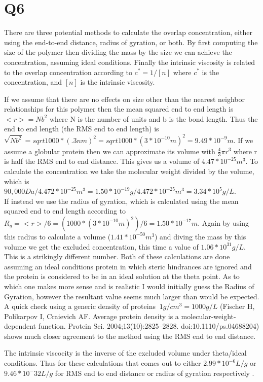 \documentclass[12pt]{article}
\begin{document}
\section{Q6}
There are three potential methods to calculate the overlap concentration, either using the end-to-end distance, radius of gyration, or both. By first computing the size of the polymer then dividing the mass by the size we can achieve the concentration, assuming ideal conditions. Finally the intrinsic viscosity is related to the overlap concentration according to $c^* = 1/[n]$ where $c^*$ is the concentration, and $[n]$ is the intrinsic viscosity.

If we assume that there are no effects on size other than the nearest neighbor relationships for this polymer then the mean squared end to end length is $<r> = Nb^2$ where N is the number of units and b is the bond length. Thus the end to end length (the RMS end to end length) is $\sqrt{Nb^2} = sqrt{1000 * (.3nm)^2} = sqrt{1000 * (3*10^{-10}m)^2} = 9.49*10^{-9} m$. If we assume a globular protein then we can approximate its volume with $\frac{4}{3}\pi r^3$ where r is half the RMS end to end distance. This gives us a volume of $4.47*10^{-25}m^3$. To calculate the concentration we take the molecular weight divided by the volume, which is $90,000 Da / 4.472*10^{-25}m^3 = 1.50*10^{-19} g / 4.472*10^{-25}m^3 = 3.34*10^{5} g/L$.\\
If instead we use the radius of gyration, which is calculated using the mean squared end to end length according to $R_g = <r>/6 = (1000 * (3*10^{-10}m)^2)/6 = 1.50*10^{-17} m$. Again by using this radius to calculate a volume ($1.41*10^{-50} m^3$) and diving the mass by this volume we get the excluded concentration, this time a value of $1.06*10^31 g/L$. This is a strikingly different number.
Both of these calculations are done assuming an ideal conditions protein in which steric hindrances are ignored and the protein is considered to be in an ideal solution at the theta point. As to which one makes more sense and is realistic I would initially guess the Radius of Gyration, however the resultant value seems much larger than would be expected. A quick check using a generic density of proteins $~1g/cm^3 = 1000 g/L$ (Fischer H, Polikarpov I, Craievich AF. Average protein density is a molecular-weight-dependent function. Protein Sci. 2004;13(10):2825–2828. doi:10.1110/ps.04688204) shows much closer agreement to the method using the RMS end to end distance.

The intrinsic viscocity is the inverse of the excluded volume under theta/ideal conditions. Thus for these calculations that comes out to either $2.99*10^{-6} L/g$ or $9.46*10^-{32}L/g$ for RMS end to end distance or radius of gyration respectively
.
\end{document}

